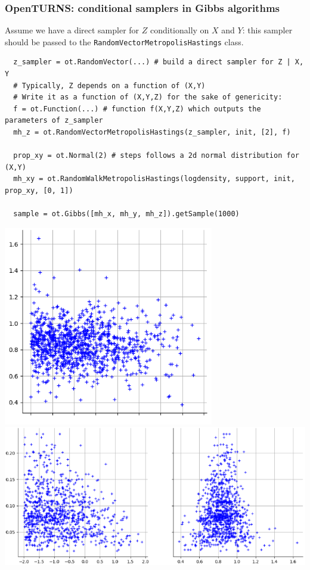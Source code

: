 \documentclass{beamer}
\begin{document}

\begin{frame}[containsverbatim]
\frametitle{OpenTURNS: conditional samplers in Gibbs algorithms}
\small
Assume we have a direct sampler for $Z$ conditionally on $X$ and $Y$:
this sampler should be passed to the \texttt{RandomVectorMetropolisHastings} class.

\begin{lstlisting}
  z_sampler = ot.RandomVector(...) # build a direct sampler for Z | X, Y
  # Typically, Z depends on a function of (X,Y)
  # Write it as a function of (X,Y,Z) for the sake of genericity:
  f = ot.Function(...) # function f(X,Y,Z) which outputs the parameters of z_sampler
  mh_z = ot.RandomVectorMetropolisHastings(z_sampler, init, [2], f)

  prop_xy = ot.Normal(2) # steps follows a 2d normal distribution for (X,Y)
  mh_xy = ot.RandomWalkMetropolisHastings(logdensity, support, init, prop_xy, [0, 1])

  sample = ot.Gibbs([mh_x, mh_y, mh_z]).getSample(1000)
\end{lstlisting}
\centering
\includegraphics[width=.33\textwidth]{figures/gibbs_1.png}
\includegraphics[width=.66\textwidth]{figures/gibbs_2.png}

\end{frame}

\end{document}
